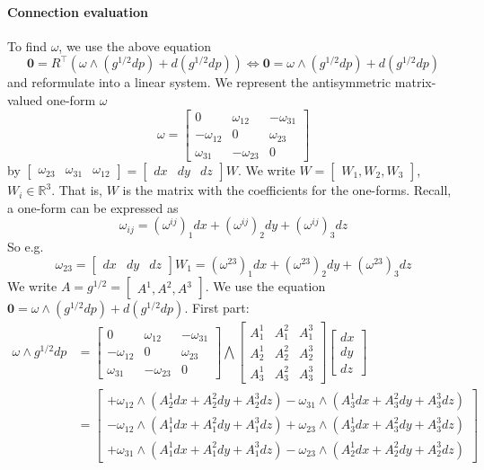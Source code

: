 \documentclass[a4paper,twoside,openright,11pt]{report}
\begin{document}
\paragraph{Connection evaluation}
To find $\omega$, we use the above equation
$$ \bm{0} = R^{\top}(\omega \wedge (g^{1/2}dp)+ d(g^{1/2}dp)) \iff \bm{0} = \omega \wedge (g^{1/2}dp)+ d(g^{1/2}dp)$$
and reformulate into a linear system.
We represent the antisymmetric matrix-valued one-form $\omega$
$$\omega = \begin{bmatrix}
 0 & \omega_{12} & -\omega_{31} \\
 -\omega_{12} & 0 & \omega_{23} \\
 \omega_{31} & -\omega_{23} & 0
\end{bmatrix}$$
by $
\begin{bmatrix}
  \omega_{23} & \omega_{31} & \omega_{12}
\end{bmatrix} = 
\begin{bmatrix}
  dx & dy & dz
\end{bmatrix} W$. We write $W=\begin{bmatrix}
  W_1,W_2,W_3
\end{bmatrix}$, $W_i \in \mathbb{R}^3$. That is, $W$ is the matrix with the coefficients for the one-forms.
Recall, a one-form can be expressed as
$$
\omega_{ij}= (\omega^{ij})_1dx + (\omega^{ij})_2dy + (\omega^{ij})_3dz
$$
So e.g. $$\omega_{23} = \begin{bmatrix}
  dx & dy & dz
\end{bmatrix}W_1 = (\omega^{23})_1dx + (\omega^{23})_2dy + (\omega^{23})_3dz$$
We write $A = g^{1/2}= \begin{bmatrix}
  A^1, A^2, A^3
\end{bmatrix}$.
We use the equation $\bm{0} = \omega \wedge (g^{1/2}dp)+ d(g^{1/2}dp)$.
First part:
\begin{align*}
  \omega \wedge g^{1/2}dp &= 
  \begin{bmatrix}
    0 & \omega_{12} & -\omega_{31} \\
    -\omega_{12} & 0 & \omega_{23} \\
    \omega_{31} & -\omega_{23} & 0
   \end{bmatrix}
   \bigwedge \begin{bmatrix}
    A^1_1 & A^2_1 & A^3_1 \\ A^1_2 & A^2_2 & A^3_2 \\ A^1_3 & A^2_3 & A^3_3 
  \end{bmatrix}
  \begin{bmatrix}
    dx \\ dy \\ dz
  \end{bmatrix} \\
  &= \begin{bmatrix}
    +\omega_{12} \wedge (A^1_2dx + A^2_2dy + A^3_2dz) - \omega_{31} \wedge (A^1_3dx + A^2_3dy + A^3_3dz) \\
    -\omega_{12} \wedge (A^1_1dx + A^2_1dy + A^3_1dz) + \omega_{23} \wedge (A^1_3dx + A^2_3dy + A^3_3dz) \\
    +\omega_{31} \wedge (A^1_1dx + A^2_1dy + A^3_1dz) - \omega_{23} \wedge (A^1_2dx+ A^2_2dy + A^3_2dz)
  \end{bmatrix}
\end{align*}
\end{document}
